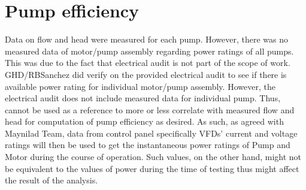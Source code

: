 %
%
%
%



\section{Pump efficiency} \label{ch04mech03}

Data on flow and head were measured for each pump. However, there was no measured data of motor/pump assembly regarding power ratings of all pumps. 
This was due to the fact that electrical audit is not part of the scope of work. GHD/RBSanchez did verify on the provided electrical audit to see if 
there is available power rating for individual motor/pump assembly. However, the electrical audit does not include measured data for individual pump. 
Thus, cannot be used as a reference to more or less correlate with measured flow and head for computation of pump efficiency as desired. As such, as agreed with Maynilad Team, 
data from control panel specifically VFDs' current and voltage ratings will then be used to get the instantaneous power 
ratings of Pump and Motor during the course of operation.
Such values, on the other hand, might not be equivalent to the values of power during the time of testing thus might affect the result of the analysis.


